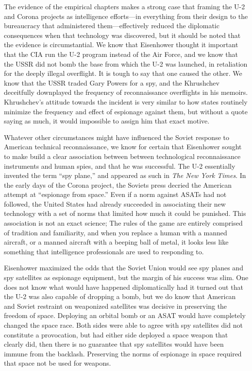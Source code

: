 \documentclass{memoir}
\begin{document}
The evidence of the empirical chapters makes a strong case that framing the U-2 and Corona projects as intelligence efforts---in everything from their design to the bureaucracy that administered them---effectively reduced the diplomatic consequences when that technology was discovered, but it should be noted that the evidence is circumstantial. We know that Eisenhower thought it important that the CIA run the U-2 program instead of the Air Force, and we know that the USSR did not bomb the base from which the U-2 was launched, in retaliation for the deeply illegal overflight. It is tough to say that one caused the other. We know that the USSR traded Gary Powers for a spy, and the Khrushchev deceitfully downplayed the frequency of reconnaissance overflights in his memoirs. Khrushchev's attitude towards the incident is very similar to how states routinely minimize the frequency and effect of espionage against them, but without a quote saying as much, it would impossible to assign him that exact motive.

Whatever other circumstances might have influenced the Soviet response to American technical reconnaissance, we know for certain that Eisenhower sought to make build a clear association between between technological reconnaissance instruments and human spies, and that he was successful. The U-2 essentially invented the term ``spy plane,'' and appeared as such in \emph{The New York Times}. In the early days of the Corona project, the Soviets press decried the American attempt at ``espionage from space.'' Even if a norm against ASATs had not followed, the United States had already succeeded in associating their new technology with a set of norms that limited how much it could be punished. This association is not an exact science; The rules of the game are entirely comprised of tradition and familiarity, and when you replace a human with a manned aircraft, or a manned aircraft with a beeping ball of metal, it looks less like something that intelligence professionals are used to responding to.

Eisenhower maximized the odds that the Soviet Union would see spy planes and spy satellites as espionage equipment, but the margin of his success was slim. One does not know what would have happened diplomatically had it turned out that the U-2 was also capable of dropping a bomb, but we do know that American and Soviet restraint on weaponized satellites was decisive in preserving the freedom of space. Deploying an orbital bomb or an ASAT would have completely changed the space race. Both sides were able to agree with spy satellites did not constitute a provocation, but had either side deployed a space weapon that clearly did, then there is no guarantee that spy satellites would have been immune from the backlash. Preserving the norms of espionage in space required that space not be used for weapons.
\end{document}
